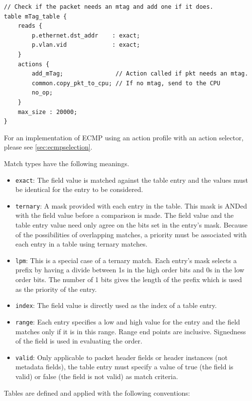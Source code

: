 \documentclass[12pt]{article}
\begin{document}
\begin{lstlisting}[style=P4style]
// Check if the packet needs an mtag and add one if it does.
table mTag_table {
    reads {
        p.ethernet.dst_addr    : exact;
        p.vlan.vid             : exact;
    }
    actions {
        add_mTag;               // Action called if pkt needs an mtag.
        common.copy_pkt_to_cpu; // If no mtag, send to the CPU
        no_op;
    }
    max_size : 20000;
}
\end{lstlisting}

For an implementation of ECMP using an action profile with an action selector,
please see \ref{sec:ecmpselection}.


Match types have the following meanings.

\begin{itemize}
\item
\texttt{exact}: The field value is matched against the table entry and the values 
must be identical for the entry to be considered.
\item
\texttt{ternary}:  A mask provided with each entry in the table. This mask is ANDed 
with the field value before a comparison is made.  The field value and the 
table entry value need only agree on the bits set in the entry's mask.  Because 
of the possibilities of overlapping matches, a priority must be associated 
with each entry in a table using ternary matches.
\item
\texttt{lpm}:  This is a special case of a ternary match. Each entry's mask selects 
a prefix by having a divide between 1s in the high order bits and 0s in the 
low order bits. The number of 1 bits gives the length of the prefix which 
is used as the priority of the entry.
\item
\texttt{index}: The field value is directly used as the index of a table entry.
\item
\texttt{range}: Each entry specifies a low and high value for the entry and the field 
matches only if it is in this range. Range end points are inclusive. Signedness 
of the field is used in evaluating the order.
\item
\texttt{valid}: Only applicable to packet header fields or header instances (not metadata 
fields), the table entry must specify a value of true (the field is valid) 
or false (the field is not valid) as match criteria.
\end{itemize}


Tables are defined and applied with the following conventions:
\end{document}
